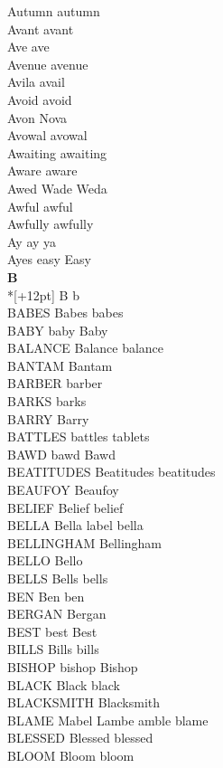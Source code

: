 Autumn autumn\\
Avant avant\\
Ave ave\\
Avenue avenue\\
Avila avail\\
Avoid avoid\\
Avon Nova\\
Avowal avowal\\
Awaiting awaiting\\
Aware aware\\
Awed Wade Weda\\
Awful awful\\
Awfully awfully\\
Ay ay ya\\
Ayes easy Easy\\

\vspace{14pt}
\noindent\textbf{\Large B}\\*[+12pt]
B b\\
BABES Babes babes\\
BABY baby Baby\\
BALANCE Balance balance\\
BANTAM Bantam\\
BARBER barber\\
BARKS barks\\
BARRY Barry\\
BATTLES battles tablets\\
BAWD bawd Bawd\\
BEATITUDES Beatitudes beatitudes\\
BEAUFOY Beaufoy\\
BELIEF Belief belief\\
BELLA Bella label bella\\
BELLINGHAM Bellingham\\
BELLO Bello\\
BELLS Bells bells\\
BEN Ben ben\\
BERGAN Bergan\\
BEST best Best\\
BILLS Bills bills\\
BISHOP bishop Bishop\\
BLACK Black black\\
BLACKSMITH Blacksmith\\
BLAME Mabel Lambe amble blame\\
BLESSED Blessed blessed\\
BLOOM Bloom bloom\\
